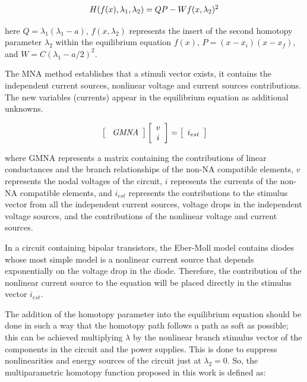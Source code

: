 \documentclass[conference,letterpaper,twocolumn]{IEEEtran}
\begin{document}
\begin{equation}
{\small
\begin{array}{l}
{H}({f}({x}),\lambda_1, \lambda_2 )=QP - W {f}({x},\lambda_2)^2
\end{array}}
\label{homotopiaPx1}
\end{equation}

here $Q=\lambda_1(\lambda_1-a)$, ${f}({x},\lambda_2)$ represents the insert of the second homotopy parameter  $\lambda_2$ within the equilibrium equation ${f}({x})$, $P=(x-x_i)(x-x_f)$, and $W=C(\lambda_1-a/2)^2$.

The MNA method establishes that a stimuli vector exists, it contains the independent current sources, nonlinear voltage and current sources contributions. The new variables (currents) appear in the equilibrium equation as additional unknowns.

\begin{equation}
\left[ \begin{array}{c}
\text{ \it GMNA}
\end{array} \right]
\left[ \begin{array}{c}
{v} \\
{i} \\
\end{array} \right]
=
\left[ \begin{array}{c}
{i_{est}}
\end{array} \right]
\end{equation}

where GMNA represents a matrix containing the contributions of linear conductances and the branch relationships of the non-NA compatible elements, ${v}$ represents the nodal voltages of the circuit, ${i}$ represents the currents of the non-NA compatible elements, and ${i_{est}}$ represents the contributions to the stimulus vector from all the independent current sources, voltage drops in the independent voltage sources, and the contributions of the nonlinear voltage and current sources.

In a circuit containing bipolar transistors, the Eber-Moll model contains diodes whose most simple model is a nonlinear current source that depends exponentially on the voltage drop in the diode. Therefore, the contribution of the nonlinear current source to the equation will be placed directly in the stimulus vector $i_{est}$.

The addition of the homotopy parameter into the equilibrium equation should be done in such a way that the homotopy path follows a path as soft as possible; this can be achieved multiplying $\lambda$ by the nonlinear  branch stimulus vector of the components in the circuit and the power supplies. This is done to suppress nonlinearities and energy sources of the circuit just at $\lambda_2=0$. So, the multiparametric homotopy function proposed in this work is defined as:
\end{document}
